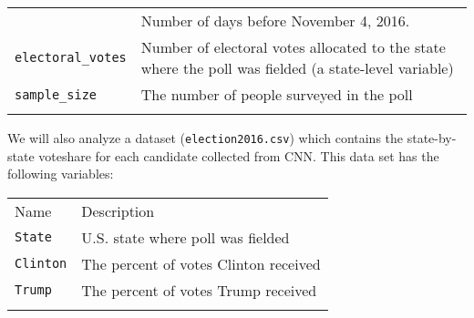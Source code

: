 \documentclass[]{article}
\begin{document}
\begin{longtable}[c]{@{}ll@{}}
\begin{minipage}[t]{0.24\columnwidth}
\end{minipage} & \begin{minipage}[t]{0.70\columnwidth}\raggedright
Number of days before November 4, 2016.
\end{minipage}
\\\addlinespace
\begin{minipage}[t]{0.24\columnwidth}\raggedright
\texttt{electoral\_votes}
\end{minipage} & \begin{minipage}[t]{0.70\columnwidth}\raggedright
Number of electoral votes allocated to the state where the poll was
fielded (a state-level variable)
\end{minipage}
\\\addlinespace
\begin{minipage}[t]{0.24\columnwidth}\raggedright
\texttt{sample\_size}
\end{minipage} & \begin{minipage}[t]{0.70\columnwidth}\raggedright
The number of people surveyed in the poll
\end{minipage}
\\\addlinespace
\bottomrule
\end{longtable}

We will also analyze a dataset (\texttt{election2016.csv}) which
contains the state-by-state voteshare for each candidate collected from
CNN. This data set has the following variables:

\begin{longtable}[c]{@{}ll@{}}
\toprule\addlinespace
\begin{minipage}[b]{0.24\columnwidth}\raggedright
Name
\end{minipage} & \begin{minipage}[b]{0.70\columnwidth}\raggedright
Description
\end{minipage}
\\\addlinespace
\midrule\endhead
\begin{minipage}[t]{0.24\columnwidth}\raggedright
\texttt{State}
\end{minipage} & \begin{minipage}[t]{0.70\columnwidth}\raggedright
U.S. state where poll was fielded
\end{minipage}
\\\addlinespace
\begin{minipage}[t]{0.24\columnwidth}\raggedright
\texttt{Clinton}
\end{minipage} & \begin{minipage}[t]{0.70\columnwidth}\raggedright
The percent of votes Clinton received
\end{minipage}
\\\addlinespace
\begin{minipage}[t]{0.24\columnwidth}\raggedright
\texttt{Trump}
\end{minipage} & \begin{minipage}[t]{0.70\columnwidth}\raggedright
The percent of votes Trump received
\end{minipage}
\\\addlinespace
\bottomrule
\end{longtable}
\end{document}
